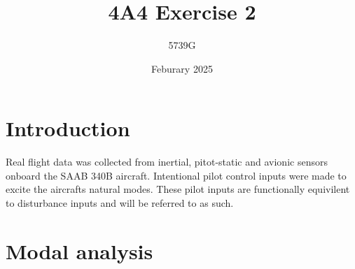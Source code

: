 \documentclass{article}
\begin{document}
\title{4A4 Exercise 2}
\author{5739G}
\date{Feburary 2025}
\maketitle

\section{Introduction}

Real flight data was collected from inertial, pitot-static and avionic sensors onboard the SAAB 340B aircraft.
Intentional pilot control inputs were made to excite the aircrafts natural modes.
These pilot inputs are functionally equivilent to disturbance inputs and will be referred to as such.

\section{Modal analysis}
\end{document}
